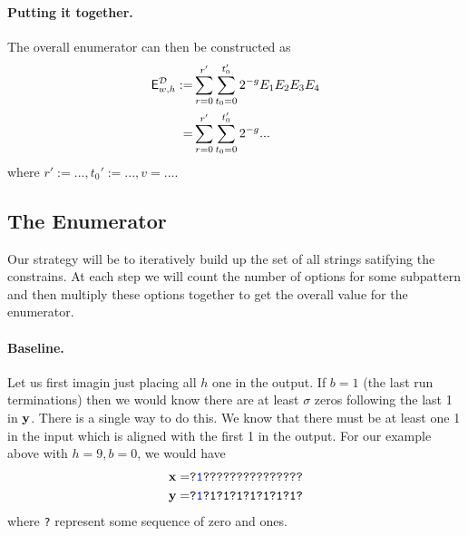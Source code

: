 \paragraph{Putting it together.}
The overall enumerator can then be constructed as
\begin{align*}
    \mathsf{E}^\mathcal{D}_{w,h} :=&\sum_{r=0}^{r'} \sum_{t_0=0}^{t_0'}2^{-g}E_1E_2E_3E_4\\
    =&\sum_{r=0}^{r'} \sum_{t_0=0}^{t_0'}2^{-g} ...
\end{align*}
where $r':=...,t_0':=..., v=...$.

\iffalse
\subsection{The Enumerator}

Our strategy will be to iteratively build up the set of all strings satifying the constrains. At each step we will count the number of options for some subpattern and then multiply these options together to get the overall value for the enumerator.

\paragraph{Baseline.} Let us first imagin just placing all $h$ one in the output. If $b=1$ (the last run terminations) then we would know there are at least $\sigma$ zeros following the last 1 in $\mathbf{y}$. There is a single way to do this. We know that there must be at least one 1 in the input which is aligned with the first 1 in the output.  For our example above with $h=9,b=0$, we would have
\begin{align*}
    \mathbf{x}=&\texttt{?\texttt{\textcolor{blue}{1}}???????????????}\\
    \mathbf{y}=&\texttt{?\texttt{\textcolor{blue}{1}}?1?1?1?1?1?1?1?}
\end{align*}
where \texttt{?} represent some sequence of zero and ones. 
